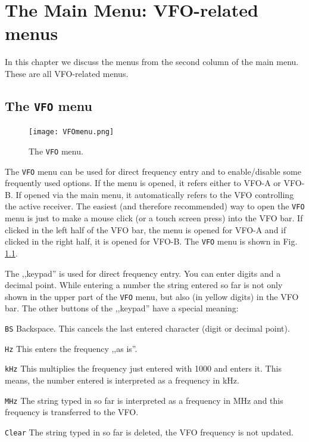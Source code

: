 \documentclass[12pt]{book}
\def\rett#1{\texttt{\color{red}#1}}
\def\bltt#1{\texttt{\color{blue}#1}}
\begin{document}
\chapter[VFO-related menus]{The Main Menu: VFO-related menus}

In this chapter we discuss the menus from the second column
of the main menu. These are all VFO-related menus.


\section{The \texttt{VFO}  menu}
\label{sec:vfomenu}

\begin{figure}[ht]
\center
\texttt{[image: VFOmenu.png]}
\caption{The \bltt{VFO} menu.}
\label{fig:VFOmenu}
\end{figure}

The \bltt{VFO} menu can be used for direct frequency entry and to
enable/disable some frequently used options. If the menu is opened,
it refers either to VFO-A or VFO-B. If opened via the main menu,
it automatically refers to the VFO controlling the active receiver.
The easiest (and therefore recommended) way to open the \bltt{VFO}
menu is just to make a mouse click (or a touch screen press) into the
VFO bar. If clicked in the left half of the VFO bar, the menu is opened
for VFO-A and if clicked in the right half, it is opened for VFO-B.
The \bltt{VFO} menu is shown in Fig. \ref{fig:VFOmenu}.


The ,,keypad'' is used for direct frequency entry. You can enter
digits and a decimal point. While entering a number the string
entered so far is not only shown in the upper part of the
\bltt{VFO} menu, but also (in yellow digits) in the VFO bar.
The other buttons of the ,,keypad'' have a special meaning:



\rett{BS} Backspace. This cancels the last entered character
(digit or decimal point).

\rett{Hz} This enters the frequency ,,as is''.

\rett{kHz} This multiplies the frequency just entered with 1000 and
enters it. This means, the number entered is interpreted as a
frequency in kHz.

\rett{MHz} The string typed in so far is interpreted as a frequency in MHz
and this frequency is transferred to the VFO.

\rett{Clear} The string typed in so far is deleted, the VFO frequency is not
updated.
\end{document}
